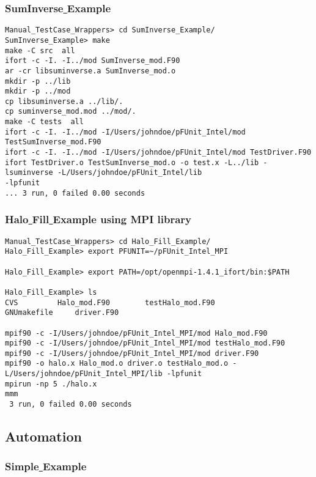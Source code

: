 \documentclass[10pt]{article}
\begin{document}
\subsubsection{SumInverse\underline{ }Example}

{\small \begin{verbatim}
Manual_TestCase_Wrappers> cd SumInverse_Example/
SumInverse_Example> make
make -C src  all
ifort -c -I. -I../mod SumInverse_mod.F90 
ar -cr libsuminverse.a SumInverse_mod.o
mkdir -p ../lib
mkdir -p ../mod
cp libsuminverse.a ../lib/.
cp suminverse_mod.mod ../mod/.
make -C tests  all
ifort -c -I. -I../mod -I/Users/johndoe/pFUnit_Intel/mod TestSumInverse_mod.F90 
ifort -c -I. -I../mod -I/Users/johndoe/pFUnit_Intel/mod TestDriver.F90 
ifort TestDriver.o TestSumInverse_mod.o -o test.x -L../lib -lsuminverse -L/Users/johndoe/pFUnit_Intel/lib 
-lpfunit
... 3 run, 0 failed 0.00 seconds

\end{verbatim}
}


\subsubsection{Halo\underline{ }Fill\underline{ }Example using MPI library}

{\small \begin{verbatim}
Manual_TestCase_Wrappers> cd Halo_Fill_Example/
Halo_Fill_Example> export PFUNIT=~/pFUnit_Intel_MPI

Halo_Fill_Example> export PATH=/opt/openmpi-1.4.1_ifort/bin:$PATH

Halo_Fill_Example> ls
CVS			Halo_mod.F90		testHalo_mod.F90
GNUmakefile		driver.F90

mpif90 -c -I/Users/johndoe/pFUnit_Intel_MPI/mod Halo_mod.F90
mpif90 -c -I/Users/johndoe/pFUnit_Intel_MPI/mod testHalo_mod.F90
mpif90 -c -I/Users/johndoe/pFUnit_Intel_MPI/mod driver.F90
mpif90 -o halo.x Halo_mod.o driver.o testHalo_mod.o -L/Users/johndoe/pFUnit_Intel_MPI/lib -lpfunit
mpirun -np 5 ./halo.x
mmm  
 3 run, 0 failed 0.00 seconds

\end{verbatim}
}

\subsection{Automation}

\subsubsection{Simple\underline{ }Example}
\end{document}
